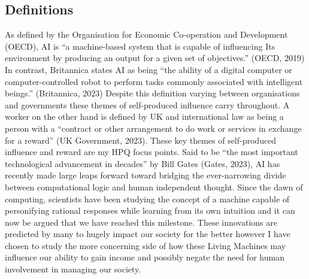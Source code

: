 \subsection{Definitions}
As defined by the Organisation for Economic Co-operation and Development (OECD), AI is “a machine-based system that is capable of influencing Its environment by producing an output for a given set of objectives.” (OECD, 2019) In contrast, Britannica states AI as being “the ability of a digital computer or computer-controlled robot to perform tasks commonly associated with intelligent beings.” (Britannica, 2023) Despite this definition varying between organisations and governments these themes of self-produced influence carry throughout. A worker on the other hand is defined by UK and international law as being a person with a “contract or other arrangement to do work or services in exchange for a reward” (UK Government, 2023). These key themes of self-produced influence and reward are my HPQ focus points. Said to be “the most important technological advancement in decades” by Bill Gates (Gates, 2023), AI has recently made large leaps forward toward bridging the ever-narrowing divide between computational logic and human independent thought. Since the dawn of computing, scientists have been studying the concept of a machine capable of personifying rational responses while learning from its own intuition and it can now be argued that we have reached this milestone. These innovations are predicted by many to hugely impact our society for the better however I have chosen to study the more concerning side of how these Living Machines may influence our ability to gain income and possibly negate the need for human involvement in managing our society.

